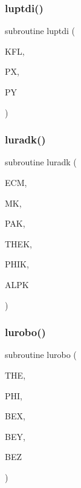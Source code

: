 \mbox{\label{jetset7409_8f_adec49ca8d72a0d30c298eb014457d5fd}} 
\subsubsection{\texorpdfstring{luptdi()}{luptdi()}}
{\footnotesize\ttfamily subroutine luptdi (\begin{DoxyParamCaption}\item[{}]{K\+FL,  }\item[{}]{PX,  }\item[{}]{PY }\end{DoxyParamCaption})}

\mbox{\label{jetset7409_8f_a685edd0a41124ba2569f60a4f4585cc2}} 
\subsubsection{\texorpdfstring{luradk()}{luradk()}}
{\footnotesize\ttfamily subroutine luradk (\begin{DoxyParamCaption}\item[{}]{E\+CM,  }\item[{}]{MK,  }\item[{}]{P\+AK,  }\item[{}]{T\+H\+EK,  }\item[{}]{P\+H\+IK,  }\item[{}]{A\+L\+PK }\end{DoxyParamCaption})}

\mbox{\label{jetset7409_8f_acd0c9860f321d2221dd01a05b17a6bac}} 
\subsubsection{\texorpdfstring{lurobo()}{lurobo()}}
{\footnotesize\ttfamily subroutine lurobo (\begin{DoxyParamCaption}\item[{}]{T\+HE,  }\item[{}]{P\+HI,  }\item[{}]{B\+EX,  }\item[{}]{B\+EY,  }\item[{}]{B\+EZ }\end{DoxyParamCaption})}

